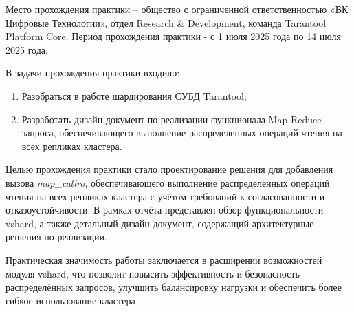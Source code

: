 \introduction

Место прохождения практики – общество с ограниченной ответственностью «ВК
Цифровые Технологии», отдел Research \& Development, команда Tarantool Platform
Core. Период прохождения практики - с 1 июля 2025 года по 14 июля 2025 года.

В задачи прохождения практики входило:

\begin{enumerate}
    \item Разобраться в работе шардирования СУБД Tarantool;
    \item Разработать дизайн-документ по реализации функционала Map-Reduce
          запроса, обеспечивающего выполнение распределенных операций чтения на
          всех репликах кластера.
\end{enumerate}

Целью прохождения практики стало проектирование решения для добавления вызова
\textit{map_callro}, обеспечивающего выполнение распределённых операций чтения
на всех репликах кластера с учётом требований к согласованности и
отказоустойчивости. В рамках отчёта представлен обзор функциональности vshard, а
также детальный дизайн-документ, содержащий архитектурные решения по реализации.

Практическая значимость работы заключается в расширении возможностей модуля
vshard, что позволит повысить эффективность и безопасность распределённых
запросов, улучшить балансировку нагрузки и обеспечить более гибкое
использование кластера
